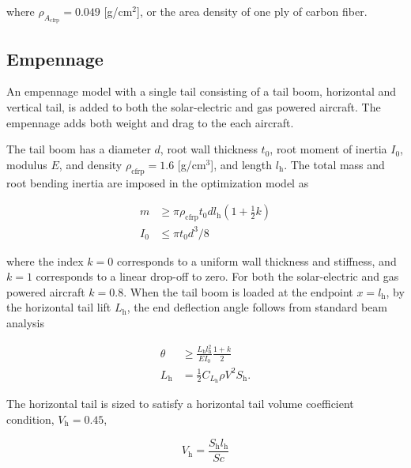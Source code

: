 \documentclass[]{aiaa-tc}%
\begin{document}
where $\rho_{A_{\text{cfrp}}} = 0.049$ [g/cm$^2$], or the area density of one ply of carbon fiber.\cite{carbonfiber}

\subsection{Empennage}

An empennage model with a single tail consisting of a tail boom, horizontal and vertical tail, is added to both the solar-electric and gas powered aircraft.  
The empennage adds both weight and drag to the each aircraft.  

The tail boom has a diameter $d$, root wall thickness $t_0$, root moment of inertia $I_0$, modulus $E$, and density $\rho_{\text{cfrp}} = 1.6$ [g/cm$^3$], and length $l_{\text{h}}$. 
The total mass and root bending inertia are imposed in the optimization model as 

\begin{align}
    m &\geq \pi \rho_{\text{cfrp}} t_0 d l_{\text{h}} \left( 1 + \frac{1}{2} k\right) \\
    I_0 &\leq \pi t_0 d^3/8
\end{align}

where the index $k=0$ corresponds to a uniform wall thickness and stiffness, and $k=1$ corresponds to a linear drop-off to zero.  For both the solar-electric and gas powered aircraft $k=0.8$.  
When the tail boom is loaded at the endpoint $x=l_{\text{h}}$, by the horizontal tail lift $L_{\text{h}}$, the end deflection angle follows from standard beam analysis

\begin{align}
    \label{e:boomdefl}
    \theta &\geq \frac{L_{\text{h}} l_{\text{h}}^2}{EI_0} \frac{1+k}{2} \\
    L_{\text{h}} &= \frac{1}{2} C_{L_{\text{h}}} \rho V^2 S_{\text{h}}.
\end{align}

The horizontal tail is sized to satisfy a horizontal tail volume coefficient condition, $V_{\text{h}} = 0.45$,\cite{aircraftrules}

\begin{equation}
    V_{\text{h}} = \frac{S_{\text{h}}l_{\text{h}}}{Sc}
\end{equation}
\end{document}
